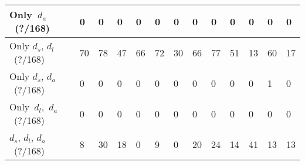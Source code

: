 \begin{sidewaystable}
{\begin{tabular}{l|l|l|l|l|l|l|l|l|l|l|l|l}
\hline
Only~\textbf{$d_a$}~(?/168)                      & 0                                 & 0                                 & 0                                 & 0                                 & 0                                 & 0                                 & 0                                 & 0                                 & 0                                 & 0                                 & 0                                 & 0                                 \\ 
\hline
Only \textbf{$d_s$}, \textbf{$d_l$}~(?/168)         & 70                                & 78                                & 47                                & 66                                & 72                                & 30                                & 66                                & 77                                & 51                                & 13                                & 60                                & 17                                \\ 
\hline
Only \textbf{$d_s$}, \textbf{$d_a$}~(?/168)         & 0                                 & 0                                 & 0                                 & 0                                 & 0                                 & 0                                 & 0                                 & 0                                 & 0                                 & 0                                 & 1                                 & 0                                 \\ 
\hline
Only~\textbf{$d_l$},~\textbf{$d_a$}~(?/168)         & 0                                 & 0                                 & 0                                 & 0                                 & 0                                 & 0                                 & 0                                 & 0                                 & 0                                 & 0                                 & 0                                 & 0                                 \\ 
\hline
\textbf{$d_s$}, \textbf{$d_l$}, \textbf{$d_a$}~(?/168) & 8                                 & 30                                & 18                                & 0                                 & 9                                 & 0                                 & 20                                & 24                                & 14                                & 41                                & 13                                & 13                                \\
\hline
\end{tabular}
}
\end{sidewaystable}

